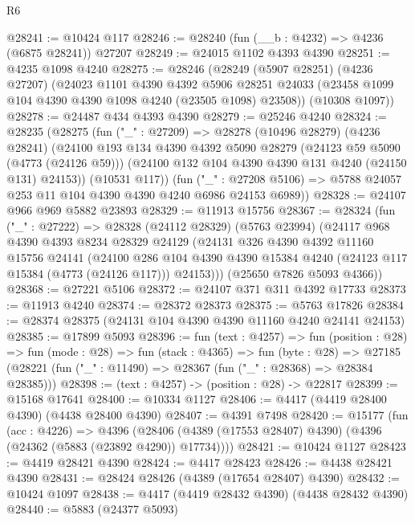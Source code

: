 \begin{lexlean}{R6}
\begin{coremodule}
@28241 := @10424 @117
@28246 := @28240 (fun (__b : @4232) => @4236 (@6875 @28241)) @27207
@28249 := @24015 @1102 @4393 @4390
@28251 := @4235 @1098 @4240
@28275 := @28246
    (@28249
      (@5907 @28251)
      (@4236 @27207)
      (@24023
        @1101
        @4390
        @4392
        @5906
        @28251
        @24033
        (@23458 @1099 @104 @4390 @4390 @1098 @4240 (@23505 @1098) @23508))
      (@10308 @1097))
@28278 := @24487 @434 @4393 @4390
@28279 := @25246 @4240
@28324 := @28235
    (@28275
      (fun ("_" : @27209) =>
      @28278
        (@10496 @28279)
        (@4236 @28241)
        (@24100
          @193
          @134
          @4390
          @4392
          @5090
          @28279
          (@24123 @59 @5090 (@4773 (@24126 @59)))
          (@24100 @132 @104 @4390 @4390 @131 @4240 (@24150 @131) @24153))
        (@10531 @117))
      (fun ("_" : @27208 @5106) => @5788 @24057 @253 @11 @104 @4390 @4390 @4240 @6986 @24153 @6989))
@28328 := @24107 @966 @969 @5882 @23893
@28329 := @11913 @15756
@28367 := @28324
    (fun ("_" : @27222) =>
    @28328
      (@24112 @28329)
      (@5763 @23994)
      (@24117
        @968
        @4390
        @4393
        @8234
        @28329
        @24129
        (@24131
          @326
          @4390
          @4392
          @11160
          @15756
          @24141
          (@24100
            @286
            @104
            @4390
            @4390
            @15384
            @4240
            (@24123 @117 @15384 (@4773 (@24126 @117)))
            @24153)))
      (@25650 @7826 @5093 @4366))
@28368 := @27221 @5106
@28372 := @24107 @371 @311 @4392 @17733
@28373 := @11913 @4240
@28374 := @28372 @28373
@28375 := @5763 @17826
@28384 := @28374 @28375 (@24131 @104 @4390 @4390 @11160 @4240 @24141 @24153)
@28385 := @17899 @5093
@28396 := fun (text : @4257) =>
  fun (position : @28) =>
  fun (mode : @28) =>
  fun (stack : @4365) =>
  fun (byte : @28) =>
  @27185 (@28221 (fun ("_" : @11490) => @28367 (fun ("_" : @28368) => @28384 @28385)))
@28398 := (text : @4257) -> (position : @28) -> @22817
@28399 := @15168 @17641
@28400 := @10334 @1127
@28406 := @4417 (@4419 @28400 @4390) (@4438 @28400 @4390)
@28407 := @4391 @7498
@28420 := @15177
    (fun (acc : @4226) =>
    @4396 (@28406 (@4389 (@17553 @28407) @4390) (@4396 (@24362 (@5883 (@23892 @4290)) @17734))))
@28421 := @10424 @1127
@28423 := @4419 @28421 @4390
@28424 := @4417 @28423
@28426 := @4438 @28421 @4390
@28431 := @28424 @28426 (@4389 (@17654 @28407) @4390)
@28432 := @10424 @1097
@28438 := @4417 (@4419 @28432 @4390) (@4438 @28432 @4390)
@28440 := @5883 (@24377 @5093)

\end{coremodule}
\end{lexlean}
